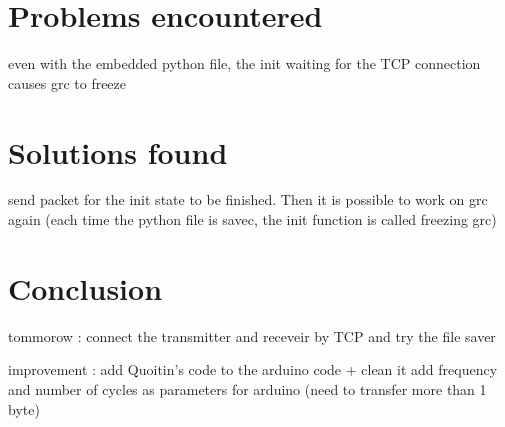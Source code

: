 \documentclass[a4paper, 12pt]{article}
\begin{document}
\section{Problems encountered} 
even with the embedded python file, the init waiting for the TCP connection causes grc to freeze

\section{Solutions found}
send packet for the init state to be finished. Then it is possible to work on grc again (each time the python file is savec, the init function is called freezing grc)

\section{Conclusion}
tommorow : connect the transmitter and receveir by TCP and try the file saver

improvement : add Quoitin's code to the arduino code + clean it
add frequency and number of cycles as parameters for arduino (need to transfer more than 1 byte)
\end{document}
